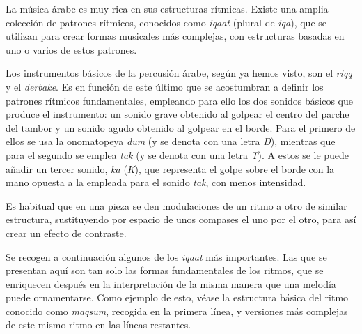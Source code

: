 La música árabe es muy rica en sus estructuras rítmicas. Existe una amplia colección de patrones rítmicos, conocidos como \emph{iqaat} (plural de \emph{iqa}), que se utilizan para crear formas musicales más complejas, con estructuras basadas en uno o varios de estos patrones.

Los instrumentos básicos de la percusión árabe, según ya hemos visto, son el \emph{riqq} y el \emph{derbake}. Es en función de este último que se acostumbran a definir los patrones rítmicos fundamentales, empleando para ello los dos sonidos básicos que produce el instrumento: un sonido grave obtenido al golpear el centro del parche del tambor y un sonido agudo obtenido al golpear en el borde. Para el primero de ellos se usa la onomatopeya \emph{dum} (y se denota con una letra \emph{D}), mientras que para el segundo se emplea \emph{tak} (y se denota con una letra \emph{T}). A estos se le puede añadir un tercer sonido, \emph{ka} (\emph{K}), que representa el golpe sobre el borde con la mano opuesta a la empleada para el sonido \emph{tak}, con menos intensidad.

Es habitual que en una pieza se den modulaciones de un ritmo a otro de similar estructura, sustituyendo por espacio de unos compases el uno por el otro, para así crear un efecto de contraste.

Se recogen a continuación algunos de los \emph{iqaat} más importantes. Las que se presentan aquí son tan solo las formas fundamentales de los ritmos, que se enriquecen después en la interpretación de la misma manera que una melodía puede ornamentarse. Como ejemplo de esto, véase la estructura básica del ritmo conocido como \emph{maqsum}, recogida en la primera línea, y versiones más complejas de este mismo ritmo en las líneas restantes.

\begin{center}
\end{center}

